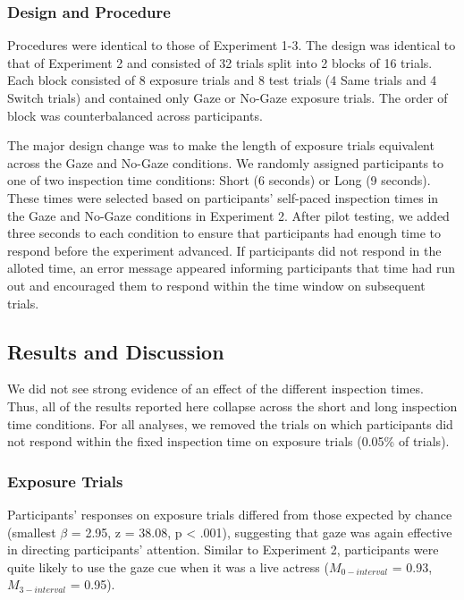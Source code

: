 \documentclass[authoryear, review]{elsarticle}
\begin{document}
\subsubsection{Design and Procedure}\label{design-and-procedure-3}

Procedures were identical to those of Experiment 1-3. The design was
identical to that of Experiment 2 and consisted of 32 trials split into
2 blocks of 16 trials. Each block consisted of 8 exposure trials and 8
test trials (4 Same trials and 4 Switch trials) and contained only Gaze
or No-Gaze exposure trials. The order of block was counterbalanced
across participants.

The major design change was to make the length of exposure trials
equivalent across the Gaze and No-Gaze conditions. We randomly assigned
participants to one of two inspection time conditions: Short (6 seconds)
or Long (9 seconds). These times were selected based on participants'
self-paced inspection times in the Gaze and No-Gaze conditions in
Experiment 2. After pilot testing, we added three seconds to each
condition to ensure that participants had enough time to respond before
the experiment advanced. If participants did not respond in the alloted
time, an error message appeared informing participants that time had run
out and encouraged them to respond within the time window on subsequent
trials.

\subsection{Results and Discussion}\label{results-and-discussion-3}

We did not see strong evidence of an effect of the different inspection
times. Thus, all of the results reported here collapse across the short
and long inspection time conditions. For all analyses, we removed the
trials on which participants did not respond within the fixed inspection
time on exposure trials (0.05\% of trials).

\subsubsection{Exposure Trials}\label{exposure-trials-3}

Participants' responses on exposure trials differed from those expected
by chance (smallest \(\beta\) = 2.95, z = 38.08, p \textless{} .001),
suggesting that gaze was again effective in directing participants'
attention. Similar to Experiment 2, participants were quite likely to
use the gaze cue when it was a live actress (\(M_{0-interval}\) = 0.93,
\(M_{3-interval}\) = 0.95).
\end{document}
